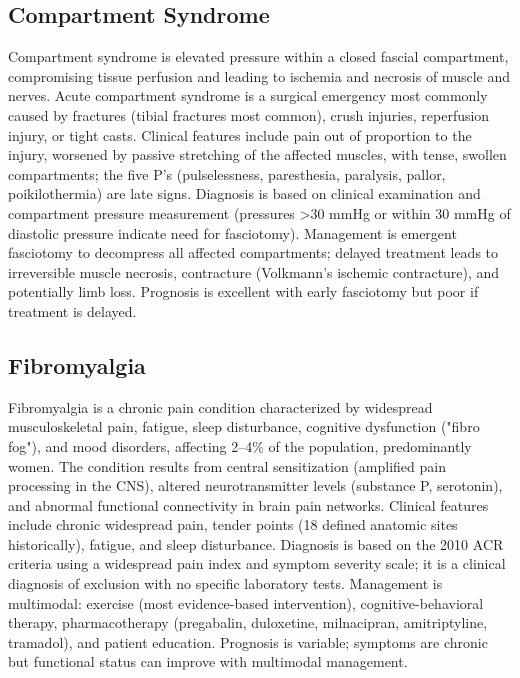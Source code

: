 \subsection{Compartment Syndrome}
\label{sec:Compartment Syndrome}
Compartment syndrome is elevated pressure within a closed fascial compartment, compromising tissue perfusion and leading to ischemia and necrosis of muscle and nerves. Acute compartment syndrome is a surgical emergency most commonly caused by fractures (tibial fractures most common), crush injuries, reperfusion injury, or tight casts. Clinical features include pain out of proportion to the injury, worsened by passive stretching of the affected muscles, with tense, swollen compartments; the five P's (pulselessness, paresthesia, paralysis, pallor, poikilothermia) are late signs. Diagnosis is based on clinical examination and compartment pressure measurement (pressures >30 mmHg or within 30 mmHg of diastolic pressure indicate need for fasciotomy). Management is emergent fasciotomy to decompress all affected compartments; delayed treatment leads to irreversible muscle necrosis, contracture (Volkmann's ischemic contracture), and potentially limb loss. Prognosis is excellent with early fasciotomy but poor if treatment is delayed.

\subsection{Fibromyalgia}
\label{sec:Fibromyalgia}
Fibromyalgia is a chronic pain condition characterized by widespread musculoskeletal pain, fatigue, sleep disturbance, cognitive dysfunction ("fibro fog"), and mood disorders, affecting 2--4\% of the population, predominantly women. The condition results from central sensitization (amplified pain processing in the CNS), altered neurotransmitter levels (substance P, serotonin), and abnormal functional connectivity in brain pain networks. Clinical features include chronic widespread pain, tender points (18 defined anatomic sites historically), fatigue, and sleep disturbance. Diagnosis is based on the 2010 ACR criteria using a widespread pain index and symptom severity scale; it is a clinical diagnosis of exclusion with no specific laboratory tests. Management is multimodal: exercise (most evidence-based intervention), cognitive-behavioral therapy, pharmacotherapy (pregabalin, duloxetine, milnacipran, amitriptyline, tramadol), and patient education. Prognosis is variable; symptoms are chronic but functional status can improve with multimodal management.

